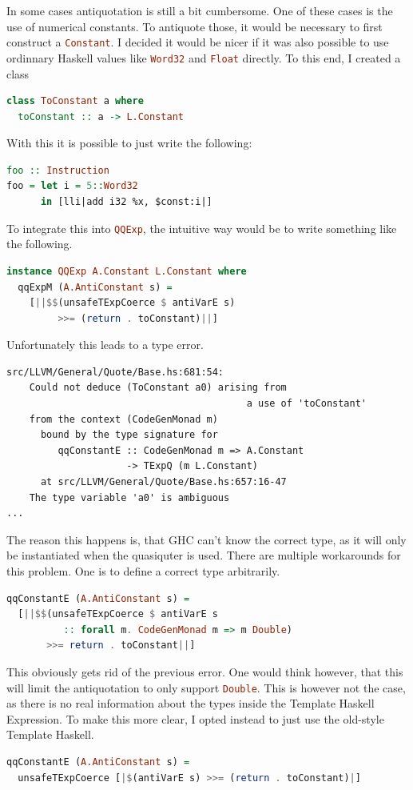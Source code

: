 \documentclass[a4paper,bibliography=totocnumbered,parskip,headsepline]{scrbook}
\begin{document}
In some cases antiquotation is still a bit cumbersome.
One of these cases is the use of numerical constants.
To antiquote those, it would be necessary to first construct a \lstinline[language=haskell]!Constant!.
I decided it would be nicer if it was also possible to use ordinnary Haskell values like \lstinline[language=haskell]!Word32! and \lstinline[language=haskell]!Float! directly.
To this end, I created a class
\begin{lstlisting}[language=haskell]
class ToConstant a where
  toConstant :: a -> L.Constant
\end{lstlisting}
With this it is possible to just write the following:
\begin{lstlisting}[language=haskell]
foo :: Instruction
foo = let i = 5::Word32
      in [lli|add i32 %x, $const:i|]
\end{lstlisting}
To integrate this into \lstinline[language=haskell]!QQExp!, the intuitive way would be to write something like the following.
\begin{lstlisting}[language=haskell]
instance QQExp A.Constant L.Constant where
  qqExpM (A.AntiConstant s) =
    [||$$(unsafeTExpCoerce $ antiVarE s)
         >>= (return . toConstant)||]
\end{lstlisting}
Unfortunately this leads to a type error.
\begin{lstlisting}[language=html]
src/LLVM/General/Quote/Base.hs:681:54:
    Could not deduce (ToConstant a0) arising from
                                          a use of 'toConstant'
    from the context (CodeGenMonad m)
      bound by the type signature for
         qqConstantE :: CodeGenMonad m => A.Constant
                     -> TExpQ (m L.Constant)
      at src/LLVM/General/Quote/Base.hs:657:16-47
    The type variable 'a0' is ambiguous
...
\end{lstlisting}
The reason this happens is, that GHC can't know the correct type, as it will only be instantiated when the quasiquter is used.
There are multiple workarounds for this problem.
One is to define a correct type arbitrarily.
\begin{lstlisting}[language=haskell]
qqConstantE (A.AntiConstant s) =
  [||$$(unsafeTExpCoerce $ antiVarE s
          :: forall m. CodeGenMonad m => m Double)
       >>= return . toConstant||]
\end{lstlisting}
This obviously gets rid of the previous error.
One would think however, that this will limit the antiquotation to only support \lstinline[language=haskell]!Double!.
This is however not the case, as there is no real information about the types inside the Template Haskell Expression.
To make this more clear, I opted instead to just use the old-style Template Haskell.
\begin{lstlisting}[language=haskell]
qqConstantE (A.AntiConstant s) =
  unsafeTExpCoerce [|$(antiVarE s) >>= (return . toConstant)|]
\end{lstlisting}
\end{document}
